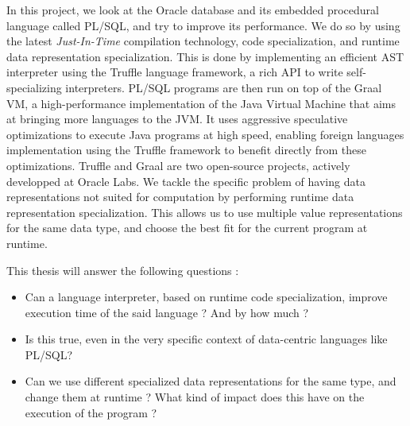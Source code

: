 \documentclass[twoside,11pt,a4paper]{article}
\begin{document}
In this project, we look at the Oracle database and its embedded procedural language called PL/SQL, and try to improve its performance. We do so by using the latest \textit{Just-In-Time} compilation technology, code specialization, and runtime data representation specialization. This is done by implementing an efficient AST interpreter using the Truffle language framework, a rich API to write self-specializing interpreters. PL/SQL programs are then run on top of the Graal VM, a high-performance implementation of the Java Virtual Machine that aims at bringing more languages to the JVM. It uses aggressive speculative optimizations to execute Java programs at high speed, enabling foreign languages implementation using the Truffle framework to benefit directly from these optimizations. Truffle and Graal are two open-source projects, actively developped at Oracle Labs. We tackle the specific problem of having data representations not suited for computation by performing runtime data representation specialization. This allows us to use multiple value representations for the same data type, and choose the best fit for the current program at runtime.

This thesis will answer the following questions :
\begin{itemize}
\item Can a language interpreter, based on runtime code specialization, improve execution time of the said language ? And by how much ?
\item Is this true, even in the very specific context of data-centric languages like PL/SQL?
\item Can we use different specialized data representations for the same type, and change them at runtime ? What kind of impact does this have on the execution of the program ?
\end{itemize}
\end{document}
